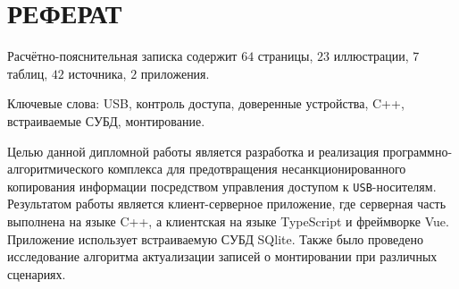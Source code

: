 \chapter*{РЕФЕРАТ}

Расчётно-пояснительная записка содержит $64$ страницы, $23$ иллюстрации, $7$ таблиц, $42$ источника, $2$ приложения.

Ключевые слова: USB, контроль доступа, доверенные устройства, C++, встраиваемые СУБД, монтирование.

Целью данной дипломной работы является разработка и реализация программно-алгоритмического комплекса для предотвращения 
несанкционированного копирования информации посредством управления доступом к \texttt{USB}-носителям.
Результатом работы является клиент-серверное приложение, где серверная часть выполнена на языке C++,
а клиентская на языке TypeScript и фреймворке Vue. Приложение использует встраиваемую СУБД SQlite. Также 
было проведено исследование алгоритма актуализации записей о монтировании при различных сценариях.
